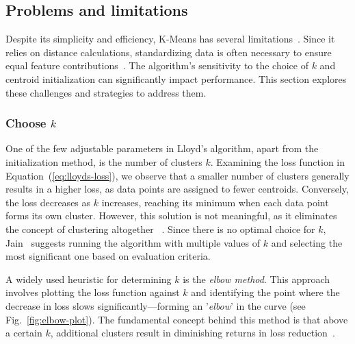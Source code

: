 \documentclass[10pt,twocolumn,letterpaper]{article}
\begin{document}

\subsection{Problems and limitations}\label{subsec:problems-and-limitations}

Despite its simplicity and efficiency, K-Means has several
limitations~\cite{Ezugwu2022104743, FRANTI201995, Jain2010651}. Since it relies
on distance calculations, standardizing data is often necessary to ensure equal
feature contributions~\cite{Morissette2013}. The algorithm’s sensitivity to the
choice of $k$ and centroid initialization can significantly impact performance.
This section explores these challenges and strategies to address them.


\subsubsection{Choose $k$}

One of the few adjustable parameters in Lloyd's algorithm, apart from the
initialization method, is the number of clusters $k$. Examining the loss
function in Equation~(\ref{eq:lloyds-loss}), we observe that a smaller number
of clusters generally results in a higher loss, as data points are assigned to
fewer centroids. Conversely, the loss decreases as $k$ increases, reaching its
minimum when each data point forms its own cluster. However, this solution is
not meaningful, as it eliminates the concept of clustering altogether
~\cite{deuschle2019}. Since there is no optimal choice for $k$,
Jain~\cite{Jain2010651} suggests running the algorithm with multiple values of
$k$ and selecting the most significant one based on evaluation criteria.

A widely used heuristic for determining $k$ is the \textit{elbow method}. This
approach involves plotting the loss function against $k$ and identifying the
point where the decrease in loss slows significantly—forming an
'\textit{elbow}' in the curve (see Fig.~\ref{fig:elbow-plot}). The fundamental
concept behind this method is that above a certain $k$, additional clusters
result in diminishing returns in loss reduction~\cite{deuschle2019}.
\end{document}

